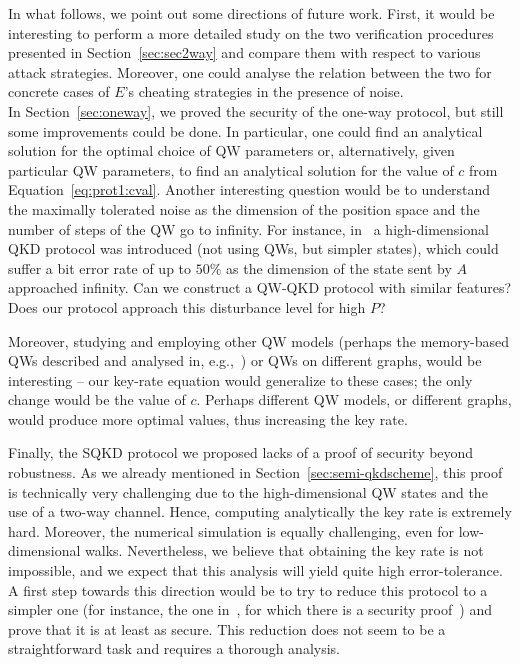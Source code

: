 In what follows, we point out some directions of future work. First, it would be interesting to perform a more detailed study on the two verification procedures presented in Section~\ref{sec:sec2way} and compare them with respect to various attack strategies. Moreover, one could analyse the relation between the two for concrete cases of $E$'s cheating strategies in the presence of noise.\\
In Section~\ref{sec:oneway}, we proved the security of the one-way protocol, but still some improvements could be done. In particular, one could find an analytical solution for the optimal choice of QW parameters or, alternatively, given particular QW parameters, to find an analytical solution for the value of $c$ from Equation~\eqref{eq:prot1:cval}. Another interesting question would be to understand the maximally tolerated noise as the dimension of the position space and the number of steps of the QW go to infinity. For instance, in~\cite{cha:15} a high-dimensional QKD protocol was introduced (not using QWs, but simpler states), which could suffer a bit error rate of up to $50\%$ as the dimension of the state sent by $A$ approached infinity. Can we construct a QW-QKD protocol with similar features?  Does our protocol approach this disturbance level for high $P$?

Moreover, studying and employing other QW models (perhaps the memory-based QWs described and analysed in, e.g.,~\cite{get:10,get:jar:mis:14,roh:bre:gil:13,kra:15,aha:amb:kem:vaz:01,bru:car:amb:03}) or QWs on different graphs, would be interesting -- our key-rate equation would generalize to these cases; the only change would be the value of $c$. Perhaps different QW models, or different graphs, would produce more optimal values, thus increasing the key rate.

Finally, the SQKD protocol we proposed lacks of a proof of security beyond robustness. As we already mentioned in Section~\ref{sec:semi-qkdscheme}, this proof is technically very challenging due to the high-dimensional QW states and the use of a two-way channel. Hence, computing analytically the key rate is extremely hard.  Moreover, the numerical simulation is equally challenging, even for low-dimensional walks. Nevertheless, we believe that obtaining the key rate is not impossible, and we expect that this analysis will yield quite high error-tolerance. A first step towards this direction would be to try to reduce this protocol to a simpler one (for instance, the one in~\cite{boy:ken:mor:07}, for which there is a security proof~\cite{krawec2015security}) and prove that it is at least as secure. This reduction does not seem to be a straightforward task and requires a thorough analysis.


%
%
%
%
%
